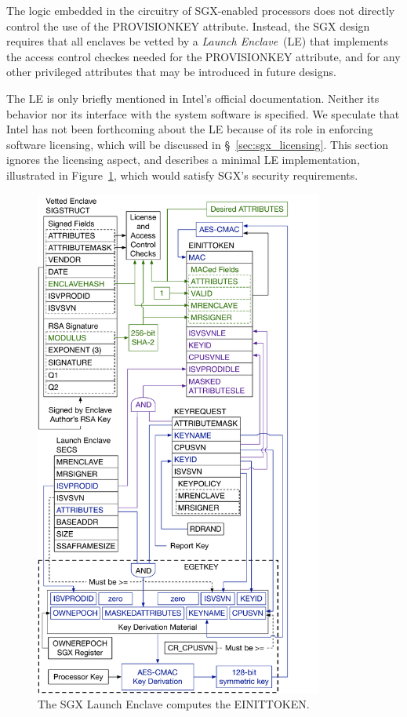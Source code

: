 The logic embedded in the circuitry of SGX-enabled processors does not directly
control the use of the PROVISIONKEY attribute. Instead, the SGX design requires
that all enclaves be vetted by a \textit{Launch Enclave}~(LE) that implements
the access control checkes needed for the PROVISIONKEY attribute, and for any
other privileged attributes that may be introduced in future designs.

The LE is only briefly mentioned in Intel's official documentation. Neither its
behavior nor its interface with the system software is specified. We speculate
that Intel has not been forthcoming about the LE because of its role in
enforcing software licensing, which will be discussed in
\S~\ref{sec:sgx_licensing}. This section ignores the licensing aspect, and
describes a minimal LE implementation, illustrated in
Figure~\ref{fig:sgx_einittoken}, which would satisfy SGX's security
requirements.

\begin{figure}[hbt!]
  \centering
  \includegraphics[width=95mm]{figures/sgx_einittoken.pdf}
  \caption{
    The SGX Launch Enclave computes the EINITTOKEN.
  }
  \label{fig:sgx_einittoken}
\end{figure}


